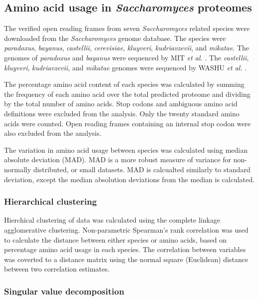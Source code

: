 \subsection{Amino acid usage in \emph{Saccharomyces} proteomes}

The verified open reading frames from seven \emph{Saccharomyces} related species were downloaded from the \emph{Saccharomyces} genome database. The species were \emph{paradoxus}, \emph{bayanus}, \emph{castellii}, \emph{cerevisiae}, \emph{kluyveri}, \emph{kudriavzevii}, and \emph{mikatae}. The genomes of \emph{paradoxus} and \emph{bayanus} were sequenced by MIT \emph{et al.} \cite{mit_paper}. The \emph{castellii}, \emph{kluyveri}, \emph{kudriavzevii}, and \emph{mikatae} genomes were sequenced by WASHU \emph{et al.} \cite{washu}.

The percentage amino acid content of each species was calculated by summing the frequency of each amino acid over the total predicted proteome and dividing by the total number of amino acids. Stop codons and ambiguous amino acid definitions were excluded from the analysis. Only the twenty standard amino acids were counted. Open reading frames containing an internal stop codon were also excluded from the analysis.

The variation in amino acid usage between species was calculated using median absolute deviation (MAD). MAD is a more robust measure of variance for non-normally distributed, or small datasets. MAD is calcualted similarly to standard deviation, except the median absolution deviations from the median is calculated.

\subsubsection{Hierarchical clustering}

Hierchical clustering of data was calculated using the complete linkage agglomerative clustering. Non-parametric Spearman's rank correlation was used to calculate the distance between either species or amino acids, based on percentage amino acid usage in each species. The correlation between variables was coverted to a distance matrix using the normal square (Euclidean) distance between two correlation estimates.

\subsubsection{Singular value decomposition}
 
